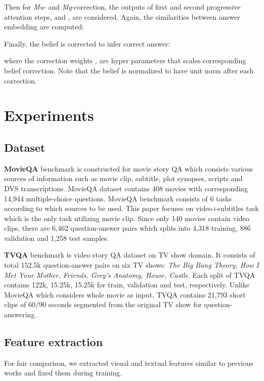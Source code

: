 \documentclass[10pt,twocolumn,letterpaper]{article}
\begin{document}
Then for \textit{Mu}- and \textit{Mg}-correction, the outputs of first and second progressive attention steps,  and , are considered. Again, the similarities between answer embedding  are computed:

Finally, the belief is corrected to infer correct answer:

where the correction weights ,  are hyper parameters that scales corresponding belief correction. Note that the belief is normalized to have unit norm after each correction. 

\section{Experiments}
\label{sec:4}

\subsection{Dataset}
\label{ssec:4.1}

\textbf{MovieQA} \cite{MovieQA} benchmark is constructed for movie story QA which consists various sources of information such as movie clip, subtitle, plot synopses, scripts and DVS transcriptions. MovieQA dataset contains 408 movies with corresponding 14,944 multiple-choice questions. MovieQA benchmark consists of 6 tasks according to which sources to be used. This paper focuses on video+subtitles task which is the only task utilizing movie clip. Since only 140 movies contain video clips, there are 6,462 question-answer pairs which splits into 4,318 training, 886 validation and 1,258 test samples.

\textbf{TVQA} \cite{lei2018tvqa} benchmark is video story QA dataset on TV show domain. It consists of total 152.5k question-answer pairs on six TV shows: \textit{The Big Bang Theory, How I Met Your Mother, Friends, Grey's Anatomy, House, Castle}. Each split of TVQA contains 122k, 15.25k, 15.25k for train, validation and test, respectively. Unlike MovieQA which considers whole movie as input, TVQA contains 21,793 short clips of 60/90 seconds segmented from the original TV show for question-answering.


\subsection{Feature extraction}
\label{ssec:4.2}
For fair comparison, we extracted visual and textual features similar to previous works \cite{rwmn,MovieQA} and fixed them during training. 
\end{document}

